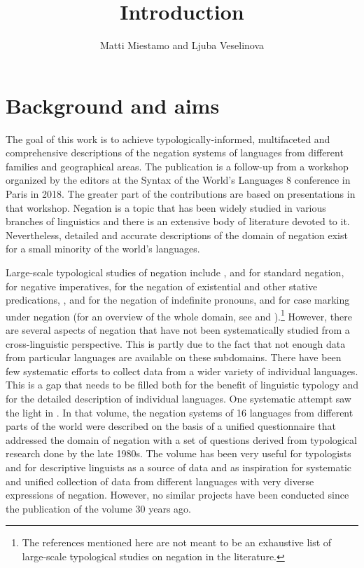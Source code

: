 \documentclass[output=paper,colorlinks,citecolor=brown]{langscibook}
\author{Matti Miestamo\orcid{https://orcid.org/0000-0001-9801-9030}\affiliation{University of Helsinki} and Ljuba Veselinova\orcid{https://orcid.org/0000-0001-6852-9021}\affiliation{Stockholm University}}
\title{Introduction}
\begin{document}
\maketitle

\section{Background and aims}\label{section1:background}

The goal of this work is to achieve typologically-informed, multifaceted and comprehensive descriptions of the negation systems of languages from different families and geographical areas. The publication is a follow-up from a workshop organized by the editors at the Syntax of the World’s Languages 8 conference in Paris in 2018. The greater part of the contributions are based on presentations in that workshop. Negation is a topic that has been widely studied in various branches of linguistics and there is an extensive body of literature devoted to it. Nevertheless, detailed and accurate descriptions of the domain of negation exist for a small minority of the world’s languages. 

Large-scale typological studies of negation include \citet{Dahl1979}, \citet{Dryer2013-wals112, Dryer2013-wals143, Dryer2013-wals144} and \citet{Miestamo2005} for standard negation, \citet{wals-71, VanOlmen2024} for negative imperatives, \citet{Veselinova2013neg.exist, Veselinova2015} for the negation of existential and other stative predications, \citet{Haspelmath2013-wals115}, \citet{Alsenoy2014} and \citet{AuweraAlsenoy2018} for the negation of indefinite pronouns, and \citet{Miestamo2014} for case marking under negation (for an overview of the whole domain, see \cite{Miestamo2007, Miestamo2017, Dahl2010} and \cite{ AuweraKrasnoukhova2020}).\footnote{The references mentioned here are not meant to be an exhaustive list of large-scale typological studies on negation in the literature.} However, there are several aspects of negation that have not been systematically studied from a cross-linguistic perspective. This is partly due to the fact that not enough data from particular languages are available on these subdomains. There have been few systematic efforts to collect data from a wider variety of individual languages. This is a gap that needs to be filled both for the benefit of linguistic typology and for the detailed description of individual languages.
One systematic attempt saw the light in \citet{KahrelBerg1994}. In that volume, the negation systems of 16 languages from different parts of the world were described on the basis of a unified questionnaire that addressed the domain of negation with a set of questions derived from typological research done by the late 1980s. The volume has been very useful for typologists and for descriptive linguists as a source of data and as inspiration for systematic and unified collection of data from different languages with very diverse expressions of negation. However, no similar projects have been conducted  since the publication of the volume 30 years ago. 
\end{document}
